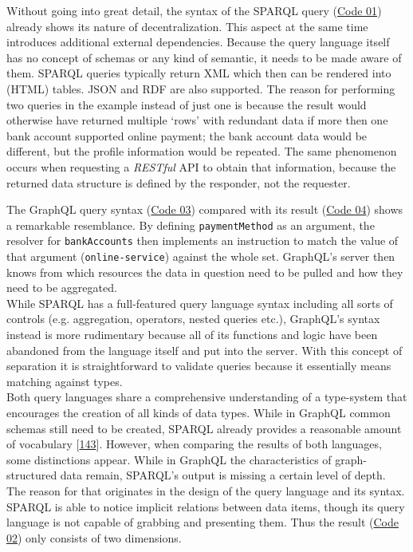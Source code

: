 \documentclass[12pt,english,a4paper,titlepage,cleardoublepage=empty,dottedtoc]{report}
\begin{document}
Without going into great detail, the syntax of the SPARQL query
(\protect\hyperlink{code-01_sparql-query}{Code 01}) already shows its
nature of decentralization. This aspect at the same time introduces
additional external dependencies. Because the query language itself has
no concept of schemas or any kind of semantic, it needs to be made aware
of them. SPARQL queries typically return XML which then can be rendered
into (HTML) tables. JSON and RDF are also supported. The reason for
performing two queries in the example instead of just one is because the
result would otherwise have returned multiple `rows' with redundant data
if more then one bank account supported online payment; the bank account
data would be different, but the profile information would be repeated.
The same phenomenon occurs when requesting a \emph{RESTful} API to
obtain that information, because the returned data structure is defined
by the responder, not the requester.

The GraphQL query syntax (\protect\hyperlink{code-03_graphql-query}{Code
03}) compared with its result
(\protect\hyperlink{code-04_graphql-query-result}{Code 04}) shows a
remarkable resemblance. By defining \texttt{paymentMethod} as an
argument, the resolver for \texttt{bankAccounts} then implements an
instruction to match the value of that argument
(\texttt{\textquotesingle{}online-service\textquotesingle{}}) against
the whole set. GraphQL's server then knows from which resources the data
in question need to be pulled and how they need to be aggregated.\\
While SPARQL has a full-featured query language syntax including all
sorts of controls (e.g. aggregation, operators, nested queries etc.),
GraphQL's syntax instead is more rudimentary because all of its
functions and logic have been abandoned from the language itself and put
into the server. With this concept of separation it is straightforward
to validate queries because it essentially means matching against
types.\\
Both query languages share a comprehensive understanding of a
type-system that encourages the creation of all kinds of data types.
While in GraphQL common schemas still need to be created, SPARQL already
provides a reasonable amount of vocabulary
{[}\protect\hyperlink{ref-web_w3c-tr_rdf-schemas}{143}{]}. However, when
comparing the results of both languages, some distinctions appear. While
in GraphQL the characteristics of graph-structured data remain, SPARQL's
output is missing a certain level of depth. The reason for that
originates in the design of the query language and its syntax. SPARQL is
able to notice implicit relations between data items, though its query
language is not capable of grabbing and presenting them. Thus the result
(\protect\hyperlink{code-02_sparql-query-results}{Code 02}) only
consists of two dimensions.
\end{document}
